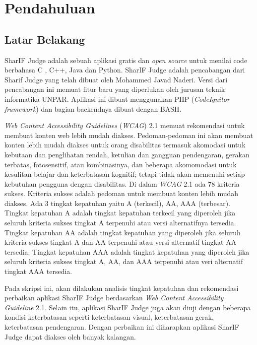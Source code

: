 \chapter{Pendahuluan}
\label{chap:intro}
   
\section{Latar Belakang}
\label{sec:label}
SharIF Judge \cite{SharIF_Judge} adalah sebuah aplikasi gratis dan \textit{open source} untuk menilai code berbahasa C , C++, Java dan Python. SharIF Judge adalah pencabangan dari Sharif Judge yang telah dibuat oleh Mohammed Javad Naderi. Versi dari pencabangan ini memuat fitur baru yang diperlukan oleh jurusan teknik informatika UNPAR. Aplikasi ini dibuat menggunakan PHP (\textit{CodeIgnitor framework}) dan bagian backendnya dibuat dengan BASH.

\textit{Web Content Accessibility Guidelines} (\textit{WCAG}) 2.1 \cite{WCAG:2.1} memuat rekomendasi untuk membuat konten web lebih mudah diakses. Pedoman-pedoman ini akan membuat konten lebih mudah diakses untuk orang disabilitas termasuk akomodasi untuk kebutaan dan penglihatan rendah, ketulian dan gangguan pendengaran, gerakan terbatas, fotosensitif, atau kombinasinya, dan beberapa akomomodasi untuk kesulitan belajar dan keterbatasan kognitif; tetapi tidak akan memenuhi setiap kebutuhan pengguna dengan disabilitas. Di dalam \textit{WCAG} 2.1 ada 78 kriteria sukses. Kriteria sukses adalah pedoman untuk membuat konten lebih mudah diakses. Ada 3 tingkat kepatuhan yaitu A (terkecil), AA, AAA (terbesar). Tingkat kepatuhan A adalah tingkat kepatuhan terkecil yang diperoleh jika seluruh kriteria sukses tingkat A terpenuhi atau versi alternatifnya tersedia. Tingkat kepatuhan AA adalah tingkat kepatuhan yang diperoleh jika seluruh kriteria sukses tingkat A dan AA terpenuhi atau versi alternatif tingkat AA tersedia. Tingkat kepatuhan AAA adalah tingkat kepatuhan yang diperoleh jika seluruh kriteria sukses tingkat A, AA, dan AAA terpenuhi atau veri alternatif tingkat AAA tersedia.

Pada skripsi ini, akan dilakukan analisis tingkat kepatuhan dan rekomendasi perbaikan aplikasi SharIF Judge berdasarkan \textit{Web Content Accessibility Guideline} 2.1. Selain itu, aplikasi SharIF Judge juga akan diuji dengan beberapa kondisi keterbatasan seperti keterbatasan visual, keterbatasan gerak, keterbatasan pendengaran. Dengan perbaikan ini diharapkan aplikasi SharIF Judge dapat diakses oleh banyak kalangan.

